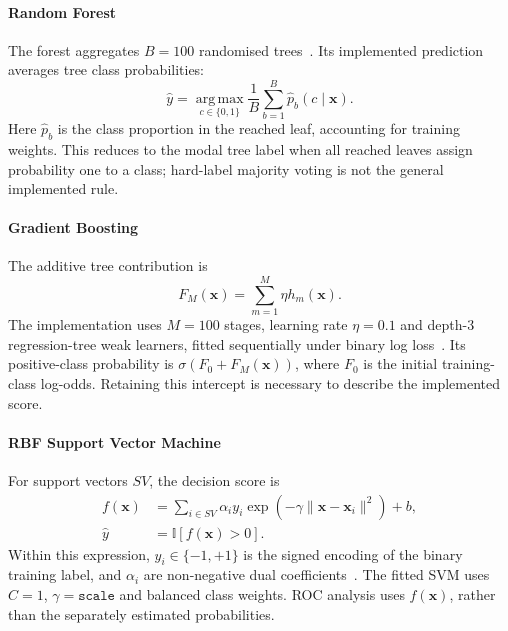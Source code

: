 \documentclass[letterpaper,10pt,conference]{ieeeconf}
\begin{document}
\paragraph{Random Forest}
The forest aggregates $B=100$ randomised trees~\cite{breiman2001}. Its implemented prediction averages tree class probabilities:
\begin{equation}
\hat{y}=\operatorname*{arg\,max}_{c\in\{0,1\}}
\frac{1}{B}\sum_{b=1}^{B}\hat{p}_b(c\mid\mathbf{x}).
\end{equation}
Here $\hat{p}_b$ is the class proportion in the reached leaf, accounting for training weights. This reduces to the modal tree label when all reached leaves assign probability one to a class; hard-label majority voting is not the general implemented rule.

\paragraph{Gradient Boosting}
The additive tree contribution is
\begin{equation}
F_M(\mathbf{x})=\sum_{m=1}^{M}\eta h_m(\mathbf{x}).
\end{equation}
The implementation uses $M=100$ stages, learning rate $\eta=0.1$ and depth-3 regression-tree weak learners, fitted sequentially under binary log loss~\cite{friedman2001}. Its positive-class probability is $\sigma(F_0+F_M(\mathbf{x}))$, where $F_0$ is the initial training-class log-odds. Retaining this intercept is necessary to describe the implemented score.

\paragraph{RBF Support Vector Machine}
For support vectors $SV$, the decision score is
\begin{equation}
\begin{aligned}
f(\mathbf{x})&=\sum_{i\in SV}\alpha_i y_i
\exp\!\left(-\gamma\|\mathbf{x}-\mathbf{x}_i\|^2\right)+b,\\
\hat{y}&=\mathbb{I}[f(\mathbf{x})>0].
\end{aligned}
\end{equation}
Within this expression, $y_i\in\{-1,+1\}$ is the signed encoding of the binary training label, and $\alpha_i$ are non-negative dual coefficients~\cite{cortes1995}. The fitted SVM uses $C=1$, $\gamma=\texttt{scale}$ and balanced class weights. ROC analysis uses $f(\mathbf{x})$, rather than the separately estimated probabilities.
\end{document}
